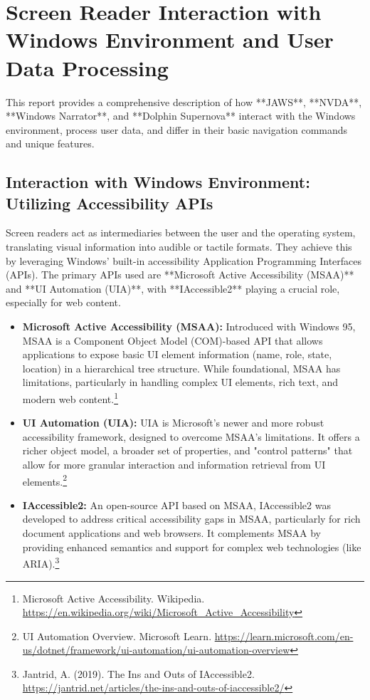 \chapter{Screen Reader Interaction with Windows Environment and User Data Processing}
\label{chap:screenreader-windows}

This report provides a comprehensive description of how **JAWS**, **NVDA**, **Windows Narrator**, and **Dolphin Supernova** interact with the Windows environment, process user data, and differ in their basic navigation commands and unique features.

\section{Interaction with Windows Environment: Utilizing Accessibility APIs}
\label{sec:interaction-apis}

Screen readers act as intermediaries between the user and the operating system, translating visual information into audible or tactile formats. They achieve this by leveraging Windows' built-in accessibility Application Programming Interfaces (APIs). The primary APIs used are **Microsoft Active Accessibility (MSAA)** and **UI Automation (UIA)**, with **IAccessible2** playing a crucial role, especially for web content.

\begin{itemize}[leftmargin=*,noitemsep,topsep=0pt]
    \item \textbf{Microsoft Active Accessibility (MSAA):} Introduced with Windows 95, MSAA is a Component Object Model (COM)-based API that allows applications to expose basic UI element information (name, role, state, location) in a hierarchical tree structure. While foundational, MSAA has limitations, particularly in handling complex UI elements, rich text, and modern web content.\footnote{Microsoft Active Accessibility. Wikipedia. \url{https://en.wikipedia.org/wiki/Microsoft_Active_Accessibility}}
    \item \textbf{UI Automation (UIA):} UIA is Microsoft's newer and more robust accessibility framework, designed to overcome MSAA's limitations. It offers a richer object model, a broader set of properties, and "control patterns" that allow for more granular interaction and information retrieval from UI elements.\footnote{UI Automation Overview. Microsoft Learn. \url{https://learn.microsoft.com/en-us/dotnet/framework/ui-automation/ui-automation-overview}}
    \item \textbf{IAccessible2:} An open-source API based on MSAA, IAccessible2 was developed to address critical accessibility gaps in MSAA, particularly for rich document applications and web browsers. It complements MSAA by providing enhanced semantics and support for complex web technologies (like ARIA).\footnote{Jantrid, A. (2019). The Ins and Outs of IAccessible2. \url{https://jantrid.net/articles/the-ins-and-outs-of-iaccessible2/}}
\end{itemize}

